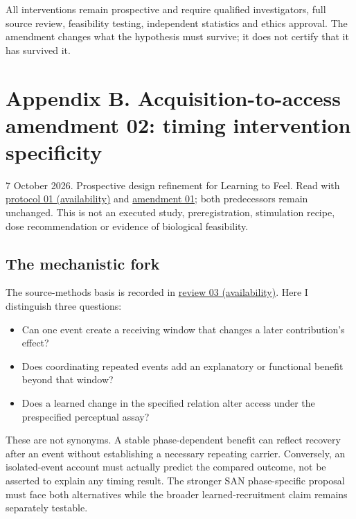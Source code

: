 \documentclass[
  american,
  11pt,
  letterpaper,
]{article}
\providecommand{\tightlist}{%
  \setlength{\itemsep}{0pt}\setlength{\parskip}{0pt}}
\begin{document}
All interventions remain prospective and require qualified investigators, full source review, feasibility testing, independent statistics and ethics approval. The amendment changes what the hypothesis must survive; it does not certify that it has survived it.

\clearpage
\endgroup
\hypertarget{appendix-b}{}

\section{Appendix B. Acquisition-to-access amendment 02: timing intervention specificity}\label{appendix-b.-acquisition-to-access-amendment-02-timing-intervention-specificity}

7 October 2026. Prospective design refinement for Learning to Feel. Read with \href{https://github.com/v5ma/v5ma.github.io/blob/master/papers/companions/learning-to-feel-v1.0/ARTIFACT-AVAILABILITY.md\#artifact-1}{protocol 01 (availability)} and \href{https://zenodo.org/records/23455801/files/Learning-to-Feel-Technical-Supplement-v1.1.pdf\#appendix-a}{amendment 01}; both predecessors remain unchanged. This is not an executed study, preregistration, stimulation recipe, dose recommendation or evidence of biological feasibility.

\subsection{The mechanistic fork}\label{the-mechanistic-fork}

The source-methods basis is recorded in \href{https://github.com/v5ma/v5ma.github.io/blob/master/papers/companions/learning-to-feel-v1.0/ARTIFACT-AVAILABILITY.md\#artifact-12}{review 03 (availability)}. Here I distinguish three questions:

\begin{itemize}
\tightlist
\item
  Can one event create a receiving window that changes a later contribution's effect?
\item
  Does coordinating repeated events add an explanatory or functional benefit beyond that window?
\item
  Does a learned change in the specified relation alter access under the prespecified perceptual assay?
\end{itemize}

These are not synonyms. A stable phase-dependent benefit can reflect recovery after an event without establishing a necessary repeating carrier. Conversely, an isolated-event account must actually predict the compared outcome, not be asserted to explain any timing result. The stronger SAN phase-specific proposal must face both alternatives while the broader learned-recruitment claim remains separately testable.
\end{document}
